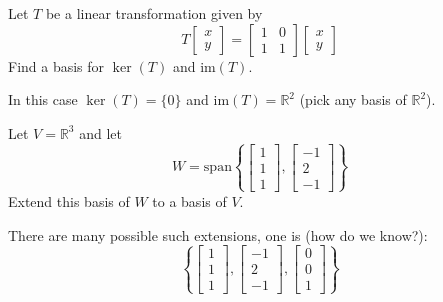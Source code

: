 \documentclass{ximera}
\begin{document}
\begin{problem}\label{prb:10.88}
 Let $T$ be a linear transformation given by
\[
T \left[ \begin{array}{r}
x\\
y
\end{array}\right] = \left[ \begin{array}{rrr}
1 & 0  \\
1 & 1
\end{array}\right]
\left[ \begin{array}{r}
x\\
y
\end{array}\right]
\]
Find a basis for $\ker \left( T\right)$ and $\mbox{im}
\left( T\right) $.

\begin{hint}
In this case $\ker \left( T\right) =\{0\}$
and $\mbox{im} \left( T\right) = \mathbb{R}^2$ (pick any basis of $\mathbb{R}^2$).
\end{hint}

\end{problem}



\begin{problem}\label{prb:10.89}
Let $V=\mathbb{R}^{3}$ and let
\begin{equation*}
W=\mbox{span}\left\{ \left[
\begin{array}{r}
1 \\
1 \\
1
\end{array}
\right] ,\left[
\begin{array}{r}
-1 \\
2 \\
-1
\end{array}
\right] \right\}
\end{equation*}
Extend this basis of $W$ to a basis of $V$.

\begin{hint}
There are many possible such extensions, one is (how do we know?):
\begin{equation*}
\left\{ \left[
\begin{array}{r}
1 \\
1 \\
1
\end{array}
\right] ,\left[
\begin{array}{r}
-1 \\
2 \\
-1
\end{array}
\right] ,\left[
\begin{array}{r}
0  \\
0\\
1
\end{array}
\right]
\right\}
\end{equation*}
\end{hint}
\end{problem}
\end{document}
